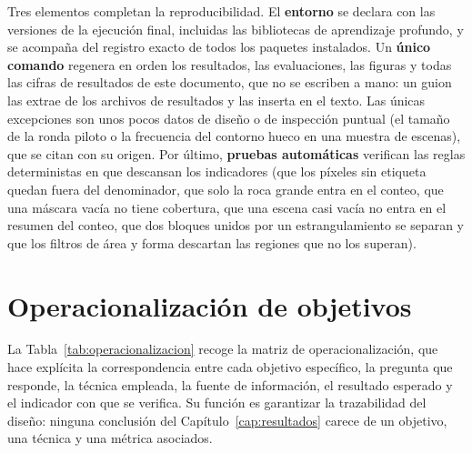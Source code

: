Tres elementos completan la reproducibilidad. El \textbf{entorno} se declara con las versiones
de la ejecución final, incluidas las bibliotecas de aprendizaje profundo, y se acompaña del
registro exacto de todos los paquetes instalados. Un \textbf{único comando} regenera en orden
los resultados, las evaluaciones, las figuras y todas las cifras de resultados de este
documento, que no se escriben a mano: un guion las extrae de los archivos de resultados y las
inserta en el texto. Las únicas excepciones son unos pocos datos de diseño o de inspección
puntual (el tamaño de la ronda piloto o la frecuencia del contorno hueco en una muestra de
escenas), que se citan con su origen. Por último, \cPruebasN{} \textbf{pruebas automáticas} verifican las reglas deterministas en que descansan
los indicadores (que los píxeles sin etiqueta quedan fuera del denominador, que solo la roca
grande entra en el conteo, que una máscara vacía no tiene cobertura, que una escena casi vacía
no entra en el resumen del conteo, que dos bloques unidos por un estrangulamiento se separan y
que los filtros de área y forma descartan las regiones que no los superan).

\section{Operacionalización de objetivos}
\label{sec:operacionalizacion}

La Tabla~\ref{tab:operacionalizacion} recoge la matriz de operacionalización, que hace
explícita la correspondencia entre cada objetivo específico, la pregunta que responde, la
técnica empleada, la fuente de información, el resultado esperado y el indicador con que se
verifica. Su función es garantizar la trazabilidad del diseño: ninguna conclusión del
Capítulo~\ref{cap:resultados} carece de un objetivo, una técnica y una métrica asociados.

